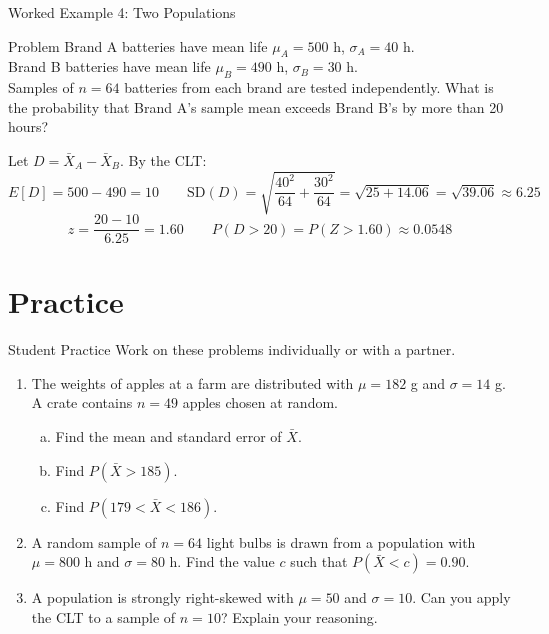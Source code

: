 \documentclass[aspectratio=169]{beamer}
\begin{document}
\begin{frame}{Worked Example 4: Two Populations}
    \begin{exampleblock}{Problem}
        Brand A batteries have mean life $\mu_A = 500$ h, $\sigma_A = 40$ h.\\
        Brand B batteries have mean life $\mu_B = 490$ h, $\sigma_B = 30$ h.\\
        Samples of $n = 64$ batteries from each brand are tested independently.
        What is the probability that Brand A's sample mean exceeds Brand B's by more
        than 20 hours?
    \end{exampleblock}

    Let $D = \bar{X}_A - \bar{X}_B$.  By the CLT:
    \[
        E[D] = 500 - 490 = 10 \qquad
        \text{SD}(D) = \sqrt{\frac{40^2}{64} + \frac{30^2}{64}}
        = \sqrt{25 + 14.06} = \sqrt{39.06} \approx 6.25
    \]
    \[
        z = \frac{20 - 10}{6.25} = 1.60 \qquad
        P(D > 20) = P(Z > 1.60) \approx \mathbf{0.0548}
    \]
\end{frame}

\section{Practice}

\begin{frame}{Student Practice}
    Work on these problems individually or with a partner.
    \begin{enumerate}
        \item The weights of apples at a farm are distributed with $\mu = 182$ g and
              $\sigma = 14$ g.  A crate contains $n = 49$ apples chosen at random.
              \begin{enumerate}[(a)]
                  \item Find the mean and standard error of $\bar{X}$.
                  \item Find $P(\bar{X} > 185)$.
                  \item Find $P(179 < \bar{X} < 186)$.
              \end{enumerate}
        \item A random sample of $n = 64$ light bulbs is drawn from a population with
              $\mu = 800$ h and $\sigma = 80$ h.  Find the value $c$ such that
              $P(\bar{X} < c) = 0.90$.
        \item A population is strongly right-skewed with $\mu = 50$ and $\sigma = 10$.
              Can you apply the CLT to a sample of $n = 10$?  Explain your reasoning.
    \end{enumerate}
\end{frame}
\end{document}
